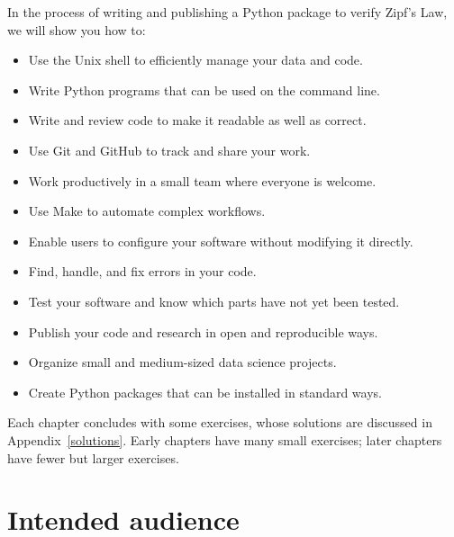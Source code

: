 \documentclass[
]{krantz}
\providecommand{\tightlist}{%
  \setlength{\itemsep}{0pt}\setlength{\parskip}{0pt}}
\begin{document}
In the process of writing and publishing a Python package to verify Zipf's Law,
we will show you how to:

\begin{itemize}
\tightlist
\item
  Use the Unix shell to efficiently manage your data and code.
\item
  Write Python programs that can be used on the command line.
\item
  Write and review code to make it readable as well as correct.
\item
  Use Git and GitHub to track and share your work.
\item
  Work productively in a small team where everyone is welcome.
\item
  Use Make to automate complex workflows.
\item
  Enable users to configure your software without modifying it directly.
\item
  Find, handle, and fix errors in your code.
\item
  Test your software and know which parts have not yet been tested.
\item
  Publish your code and research in open and reproducible ways.
\item
  Organize small and medium-sized data science projects.
\item
  Create Python packages that can be installed in standard ways.
\end{itemize}

Each chapter concludes with some exercises,
whose solutions are discussed in Appendix~\ref{solutions}.
Early chapters have many small exercises;
later chapters have fewer but larger exercises.

\hypertarget{intro-personas}{%
\section{Intended audience}\label{intro-personas}}
\end{document}
